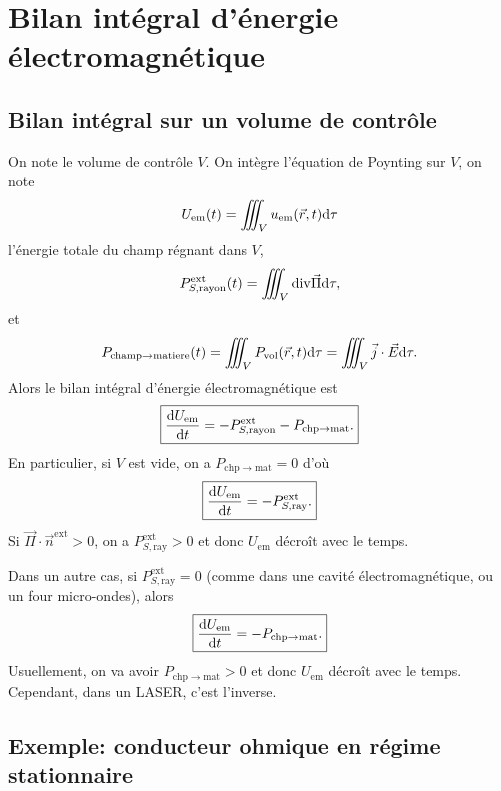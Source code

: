 \section{Bilan intégral d'énergie électromagnétique}
\subsection{Bilan intégral sur un volume de contrôle}

On note le volume de contrôle $V$. On intègre l'équation de Poynting sur $V$, on note 
\begin{equation}
    U_{\mathrm{em}}(t)=\iiint_{V}u_{\mathrm{em}}(\vec{r},t)\mathrm{d}\tau
\end{equation}
l'énergie totale du champ régnant dans $V$,
\begin{equation}
    P_{S,\mathrm{rayon}}^{\mathrm{ext}}(t)=\iiint_{V}\mathrm{div}\vec{\Pi}\mathrm{d}\tau,
\end{equation}
et
\begin{equation}
    P_{\mathrm{champ}\to\mathrm{matiere}}(t)=\iiint_{V}P_{\mathrm{vol}}(\vec{r},t)\mathrm{d}\tau=\iiint_{V}\vec{j}\cdot\vec{E}\mathrm{d}\tau.
\end{equation}
Alors le bilan intégral d'énergie électromagnétique est
\begin{equation}
    \boxed{
        \frac{\mathrm{d} U_{\mathrm{em}}}{\mathrm{d} t}=-P_{S,\mathrm{rayon}}^{\mathrm{ext}}-P_{\mathrm{chp}\to\mathrm{mat}}.
    }
\end{equation}
En particulier, si $V$ est vide, on a $P_{\mathrm{chp}\to\mathrm{mat}}=0$ d'où 
\begin{equation}
    \boxed{
        \frac{\mathrm{d} U_{\mathrm{em}}}{\mathrm{d} t}=-P_{S,\mathrm{ray}}^{\mathrm{ext}}.
    }
\end{equation}
Si $\vec{\Pi}\cdot\vec{n}^{\mathrm{ext}}>0$, on a $P_{S,\mathrm{ray}}^{\mathrm{ext}}>0$ et donc $U_{\mathrm{em}}$ décroît avec le temps.

Dans un autre cas, si $P_{S,\mathrm{ray}}^{\mathrm{ext}}=0$ (comme dans une cavité électromagnétique, ou un four micro-ondes), alors 
\begin{equation}
    \boxed{
        \frac{\mathrm{d} U_{\mathrm{em}}}{\mathrm{d} t}=-P_{\mathrm{chp}\to\mathrm{mat}}.
    }
\end{equation}
Usuellement, on va avoir $P_{\mathrm{chp}\to\mathrm{mat}}>0$ et donc $U_{\mathrm{em}}$ décroît avec le temps. Cependant, dans un LASER, c'est l'inverse.

\subsection{Exemple: conducteur ohmique en régime stationnaire}

